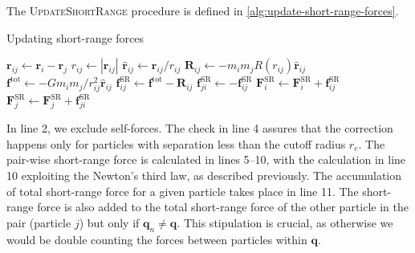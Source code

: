 The \textsc{UpdateShortRange} procedure is defined in \autoref{alg:update-short-range-forces}.
\begin{algorithm}
    \caption{Updating short-range forces}\label{alg:update-short-range-forces}
    \begin{algorithmic}[1]
        \Return
        \EndIf
        \State $\mathbf{r}_{ij} \gets \mathbf{r}_i - \mathbf{r}_j$
        \Return
        \EndIf
        \State $r_{ij} \gets |\mathbf{r}_{ij}|$
        \State $\mathbf{\hat{r}}_{ij} \gets \mathbf{r}_{ij} / r_{ij}$
        \State $\mathbf{R}_{ij} \gets -m_i m_j R(r_{ij}) \mathbf{\hat{r}}_{ij}$
        \State $\mathbf{f}^\text{tot} \gets -G m_i m_j / r_{ij}^2 \mathbf{\hat{r}}_{ij}$
        \State $\mathbf{f}^\text{SR}_{ij} \gets \mathbf{f}^\text{tot} - \mathbf{R}_{ij}$
        \State $\mathbf{f}^\text{SR}_{ji} \gets -\mathbf{f}^\text{SR}_{ij}$
        \State $\mathbf{F}^\text{SR}_i \gets \mathbf{F}^\text{SR}_i + \mathbf{f}^\text{SR}_{ij}$
         
        \State $\mathbf{F}^\text{SR}_j \gets \mathbf{F}^\text{SR}_j + \mathbf{f}^\text{SR}_{ji}$
        \EndIf
        \EndProcedure
    \end{algorithmic}
\end{algorithm}
In line 2, we exclude self-forces.
The check in line 4 assures that the correction happens only for particles with separation less than the cutoff radius $r_e$.
The pair-wise short-range force is calculated in lines 5--10, with the calculation in line 10 exploiting the Newton's third law, as described previously.
The accumulation of total short-range force for a given particle takes place in line 11.
The short-range force is also added to the total short-range force of the other particle in the pair (particle $j$) but only if $\mathbf{q}_n \neq \mathbf{q}$.
This stipulation is crucial, as otherwise we would be double counting the forces between particles within $\mathbf{q}$.

